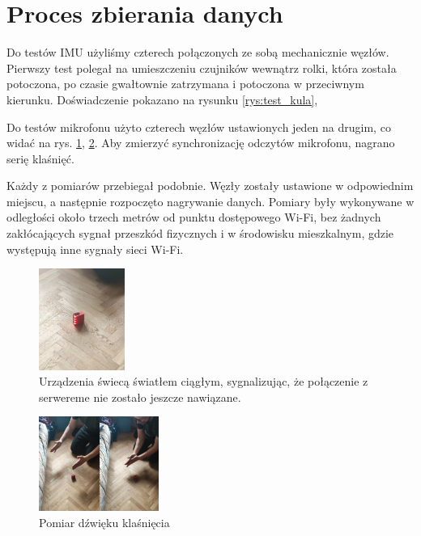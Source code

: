 \documentclass[12pt,oneside,a4paper]{book}
\theoremstyle{break}
\begin{document}
\section{Proces zbierania danych}
Do testów IMU użyliśmy czterech połączonych ze sobą mechanicznie węzłów.
Pierwszy test polegał na umieszczeniu czujników wewnątrz rolki,
która została potoczona, po czasie gwałtownie zatrzymana
i potoczona w przeciwnym kierunku. Doświadczenie pokazano na
rysunku \ref{rys:test_kula},
\par Do testów mikrofonu użyto czterech węzłów ustawionych jeden
na drugim, co widać na rys. \ref{rys:test_connecting},
 \ref{rys:test_first_test}.
Aby zmierzyć synchronizację odczytów mikrofonu, nagrano serię
klaśnięć. 
\par Każdy z pomiarów przebiegał podobnie. Węzły zostały ustawione
w odpowiednim miejscu, a następnie rozpoczęto nagrywanie danych.
Pomiary były wykonywane w odległości 
około trzech metrów od punktu dostępowego Wi-Fi, bez żadnych zakłócających
sygnał przeszkód fizycznych i w środowisku mieszkalnym, gdzie występują 
inne sygnały sieci Wi-Fi.

\begin{figure}[H]
    \begin{center}
        \includegraphics[width=0.25\textwidth]{test_connecting.png}
        \caption{Urządzenia świecą światłem ciągłym, sygnalizując, że połączenie z serwereme nie zostało jeszcze nawiązane.}
        \label{rys:test_connecting}
    \end{center}
\end{figure}

\begin{figure}[H]
    \begin{center} 
        \includegraphics[width=0.35\textwidth]{test_first_test.png}
        \caption{Pomiar dźwięku klaśnięcia}
        \label{rys:test_first_test}
    \end{center}
\end{figure}
\end{document}
